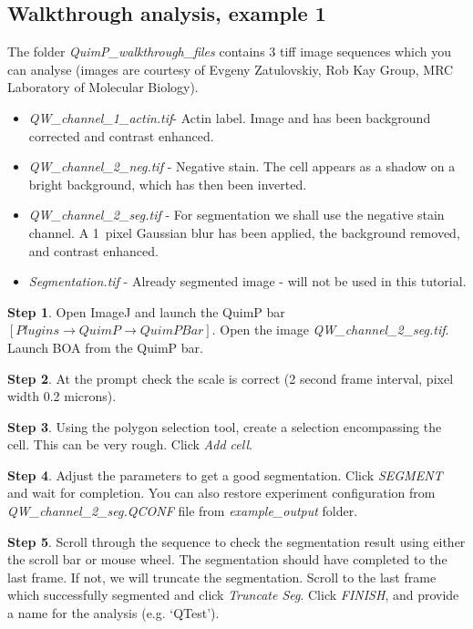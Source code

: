 \documentclass[a4paper,12pt]{article}
\begin{document}
\subsection{Walkthrough analysis, example 1}
\label{walkthrough}

The folder \emph{QuimP\_walkthrough\_files} contains 3 tiff image sequences which you can
analyse (images are courtesy of Evgeny Zatulovskiy, Rob Kay Group, MRC Laboratory of Molecular Biology).

\begin{itemize}
	\item \textit{QW\_channel\_1\_actin.tif}- Actin label.  Image and has been background corrected and contrast enhanced.
	\item \textit{QW\_channel\_2\_neg.tif} - Negative stain.  The cell appears as a shadow on a bright
	background, which has then been inverted.
	\item \textit{QW\_channel\_2\_seg.tif} - For segmentation we shall use the negative stain channel.  
	A 1~pixel Gaussian blur has been applied, the background removed, and contrast enhanced.  
	\item \textit{Segmentation.tif} - Already segmented image - will not be used in this tutorial.
\end{itemize}

\textbf{Step 1}. Open ImageJ and launch the QuimP bar $[Plugins\rightarrow QuimP\rightarrow QuimP Bar]$.  Open the image \textit{QW\_channel\_2\_seg.tif}.  Launch BOA from the QuimP bar.

\textbf{Step 2}. At the prompt check the scale is correct (2 second frame interval, pixel width 0.2 microns).

\textbf{Step 3}. Using the polygon selection tool, create a selection encompassing the cell. This can be very rough.
Click \emph{Add cell}.

\textbf{Step 4}.  Adjust the parameters to get a good segmentation.  Click \emph{SEGMENT} and wait for completion. You can also restore experiment configuration from \textit{QW\_channel\_2\_seg.QCONF} file from \textit{example\_output} folder.

\textbf{Step 5}. Scroll through the sequence to check the segmentation result using either the scroll bar or mouse
wheel. The segmentation should have completed to the last frame.  If not, we will truncate the segmentation.
Scroll to the last frame which successfully segmented and click \emph{Truncate Seg}.
Click \emph{FINISH}, and provide a name for the analysis (e.g. `QTest').
\end{document}
